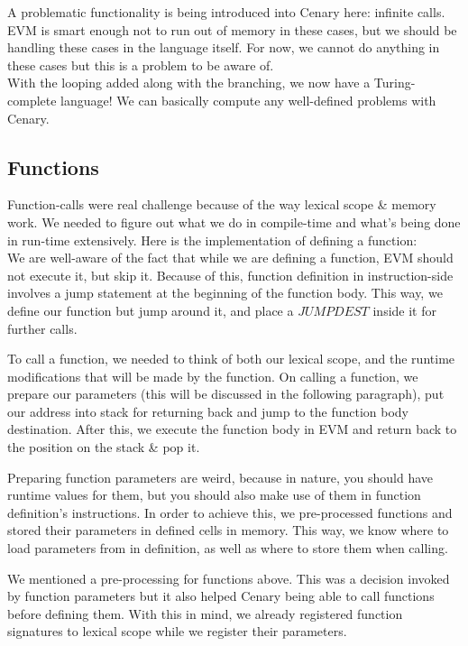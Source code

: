 \documentclass{article}
\begin{document}
A problematic functionality is being introduced into Cenary here: infinite calls. EVM is smart enough not to run out of memory in these cases, but we should be handling these cases in the language itself. For now, we cannot do anything in these cases but this is a problem to be aware of. \\

With the looping added along with the branching, we now have a Turing-complete language! We can basically compute any well-defined problems with Cenary.

\subsection{Functions}
Function-calls were real challenge because of the way lexical scope \& memory work. We needed to figure out what we do in compile-time and what's being done in run-time extensively. Here is the implementation of defining a function: \\

We are well-aware of the fact that while we are defining a function, EVM should not execute it, but skip it. Because of this, function definition in instruction-side involves a jump statement at the beginning of the function body. This way, we define our function but jump around it, and place a $JUMPDEST$ inside it for further calls.

To call a function, we needed to think of both our lexical scope, and the runtime modifications that will be made by the function. On calling a function, we prepare our parameters (this will be discussed in the following paragraph), put our address into stack for returning back and jump to the function body destination. After this, we execute the function body in EVM and return back to the position on the stack \& pop it.

Preparing function parameters are weird, because in nature, you should have runtime values for them, but you should also make use of them in function definition's instructions. In order to achieve this, we pre-processed functions and stored their parameters in defined cells in memory. This way, we know where to load parameters from in definition, as well as where to store them when calling.

We mentioned a pre-processing for functions above. This was a decision invoked by function parameters but it also helped Cenary being able to call functions before defining them. With this in mind, we already registered function signatures to lexical scope while we register their parameters.
\end{document}
